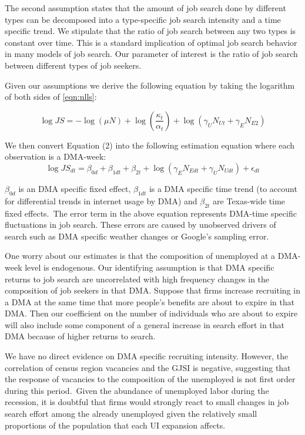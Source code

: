 \documentclass[12pt]{article}
\begin{document}
\begin{spacing}{2}
\begin{appendix}
\begin{spacing}{2}
The second assumption states that the amount of job search done by different types can be decomposed into a type-specific job search intensity and a time specific trend. We stipulate that the ratio of job search between any two types is constant over time. This is a standard implication of optimal job search behavior in many models of job search. Our parameter of interest is the ratio of job search between different types of job seekers.

Given our assumptions we derive the following equation by taking the logarithm of both sides of \autoref{eqn:nlls}:

\begin{equation}
\log{JS} =-\log{(\mu N)} + \log{(\frac{\kappa_{t}}{\alpha_{t}})} +\log{(\gamma_{U}N_{Ut}+\gamma_{E}N_{E2})}
\end{equation}

We then convert Equation (2) into the following estimation equation where each observation is a DMA-week:
\begin{equation}\label{eqn:estimating_eq_app}
\log{JS}_{dt} =\beta_{0d} + \beta_{1dt} + \beta_{2t}+\log{(\gamma_{E}N_{Edt}+\gamma_{U}N_{Udt})}+\epsilon_{dt}
\end{equation}

$\beta_{0d}$ is an DMA specific fixed effect, $\beta_{1dt}$ is a DMA specific time trend (to account for differential trends in internet usage by DMA) and $\beta_{2t}$ are Texas-wide time fixed effects.\footnotemark \ The error term in the above equation represents DMA-time specific fluctuations in job search. These errors are caused by unobserved drivers of search such as DMA specific weather changes or Google's sampling error.

One worry about our estimates is that the composition of unemployed at a DMA-week level is endogenous. Our identifying assumption is that DMA specific returns to job search are uncorrelated with high frequency changes in the composition of job seekers in that DMA. Suppose that firms increase recruiting in a DMA at the same time that more people's benefits are about to expire in that DMA. Then our coefficient on the number of individuals who are about to expire will also include some component of a general increase in search effort in that DMA because of higher returns to search.

We have no direct evidence on DMA specific recruiting intensity. However, the correlation of census region vacancies and the GJSI is negative, suggesting that the response of vacancies to the composition of the unemployed is not first order during this period.\footnotemark \ Given the abundance of unemployed labor during the recession, it is doubtful that firms would strongly react to small changes in job search effort among the already unemployed given the relatively small proportions of the population that each UI expansion affects.


\end{spacing}
\end{appendix}
\end{spacing}
\end{document}
